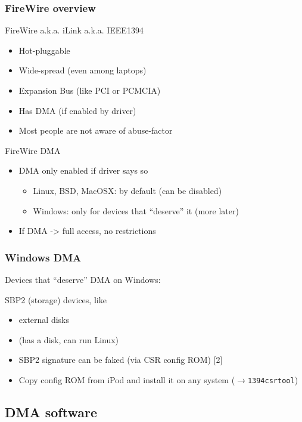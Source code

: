\documentclass{beamer}
\newenvironment{itemizeframe}[1]
  {\begin{frame}{#1}\startitemizeframe}
  {\stopitemizeframe\end{frame}}
\newcommand\startitemizeframe{\begin{itemize}}
\newcommand\stopitemizeframe{\end{itemize}}
\begin{document}
		\begin{frame} \frametitle{FireWire overview}
			 FireWire a.k.a. iLink a.k.a. IEEE1394
			\begin{itemize}
				\item Hot-pluggable
				\item Wide-spread (even among laptops)
				\item Expansion Bus (like PCI or PCMCIA)
				\item Has DMA (if enabled by driver)
				\item Most people are not aware of abuse-factor
			\end{itemize}
		\end{frame}

		\begin{itemizeframe}{FireWire DMA}
			\item DMA only enabled if driver says so
			\begin{itemize}
				\item Linux, BSD, MacOSX: by default (can be disabled)
				\item Windows: only for devices that ``deserve'' it (more later)
			\end{itemize}
			\item If DMA -> full access, no restrictions
		\end{itemizeframe}

		\begin{frame} \frametitle{Windows DMA}
			Devices that ``deserve'' DMA on Windows:

			SBP2 (storage) devices, like
			\begin{itemize}
				\item external disks
				\item {} (has a disk, can run Linux)

				\item<2-> SBP2 signature can be faked (via CSR config ROM) [2]
				\item<2-> Copy config ROM from iPod and install it on any system ($\rightarrow$\texttt{1394csrtool})
			\end{itemize}
		\end{frame}
		
	\subsection{DMA software}
\end{document}
